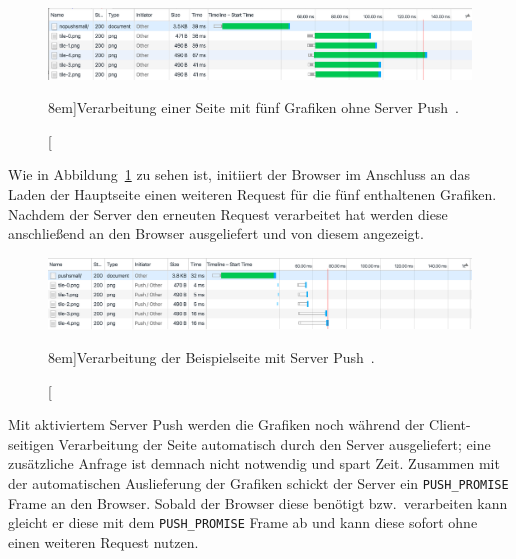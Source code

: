 \documentclass[a4paper, justified, notoc]{tufte-handout} %
\begin{document}
\begin{figure}%
	\centering
  \includegraphics[width=1.55\textwidth]{./figures/server_push_ohne.png}
  \caption[][8em]{Verarbeitung einer Seite mit fünf Grafiken ohne Server Push~\citep{vlad:2016}.}
  \label{fig:server_push_ohne}
\end{figure}
Wie in Abbildung~\ref{fig:server_push_ohne} zu sehen ist, initiiert der Browser im Anschluss an das Laden der Hauptseite einen weiteren Request für die fünf enthaltenen Grafiken. Nachdem der Server den erneuten Request verarbeitet hat werden diese anschließend an den Browser ausgeliefert und von diesem angezeigt.

\begin{figure}%
	\centering
  \includegraphics[width=1.55\textwidth]{./figures/server_push_mit.png}
  \caption[][8em]{Verarbeitung der Beispielseite mit Server Push~\citep{vlad:2016}.}
  \label{fig:server_push_mit}
\end{figure}

Mit aktiviertem Server Push werden die Grafiken noch während der Client-seitigen Verarbeitung der Seite automatisch durch den Server ausgeliefert; eine zusätzliche Anfrage ist demnach nicht notwendig und spart Zeit. Zusammen mit der automatischen Auslieferung der Grafiken schickt der Server ein \texttt{PUSH\_PROMISE} Frame an den Browser. Sobald der Browser diese benötigt bzw.\ verarbeiten kann gleicht er diese mit dem \texttt{PUSH\_PROMISE} Frame ab und kann diese sofort ohne einen weiteren Request nutzen. 
\end{document}
